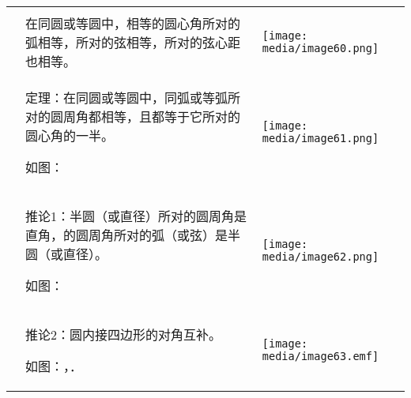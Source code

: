 \documentclass[a4paper,11pt,UTF8]{ctexart}
\begin{document}
\begin{longtable}[]{@{}lll@{}}
\toprule
\endhead
& &\tabularnewline
&
在同圆或等圆中，相等的圆心角所对的弧相等，所对的弦相等，所对的弦心距也相等。
&
\texttt{[image: media/image60.png]}\tabularnewline
\begin{minipage}[t]{0.30\columnwidth}\raggedright
\strut
\end{minipage} & \begin{minipage}[t]{0.30\columnwidth}\raggedright
定理：在同圆或等圆中，同弧或等弧所对的圆周角都相等，且都等于它所对的圆心角的一半。

如图：\strut
\end{minipage} & \begin{minipage}[t]{0.30\columnwidth}\raggedright
\texttt{[image: media/image61.png]}\strut
\end{minipage}\tabularnewline
\begin{minipage}[t]{0.30\columnwidth}\raggedright
\strut
\end{minipage} & \begin{minipage}[t]{0.30\columnwidth}\raggedright
推论1：半圆（或直径）所对的圆周角是直角，的圆周角所对的弧（或弦）是半圆（或直径）。

如图：\strut
\end{minipage} & \begin{minipage}[t]{0.30\columnwidth}\raggedright
\texttt{[image: media/image62.png]}\strut
\end{minipage}\tabularnewline
\begin{minipage}[t]{0.30\columnwidth}\raggedright
\strut
\end{minipage} & \begin{minipage}[t]{0.30\columnwidth}\raggedright
推论2：圆内接四边形的对角互补。

如图：，．\strut
\end{minipage} & \begin{minipage}[t]{0.30\columnwidth}\raggedright
\texttt{[image: media/image63.emf]}\strut
\end{minipage}\tabularnewline
\bottomrule
\end{longtable}

\hypertarget{section-18}{%
\subsubsection{}\label{section-18}}
\end{document}
